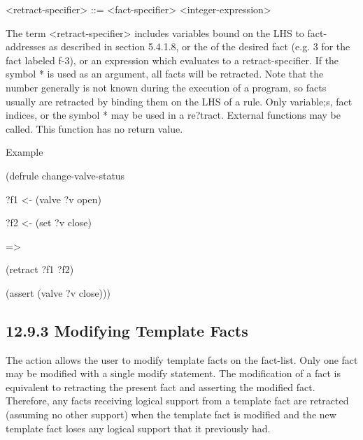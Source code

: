 \documentclass[letterpaper,10pt,english]{sphinxmanual}
\begin{document}

\begin{sphinxVerbatim}[commandchars=\\\{\}]
  \PYGZbs{} \PYGZbs{}
\end{sphinxVerbatim}

\textless{}retract-specifier\textgreater{} ::= \textless{}fact-specifier\textgreater{} \textbar{} \textless{}integer-expression\textgreater{}

The term \textless{}retract-specifier\textgreater{} includes variables bound on the LHS to
fact-addresses as described in section 5.4.1.8, or the  of
the desired fact (e.g. 3 for the fact labeled f-3), or an expression
which evaluates to a retract-specifier. If the symbol * is used as an
argument, all facts will be retracted. Note that the number generally is
not known during the execution of a program, so facts usually are
retracted by binding them on the LHS of a rule. Only variable;s, fact
indices, or the symbol * may be used in a re?tract. External functions
may  be called. This function has no return value.

Example

\begin{DUlineblock}{0em}
\item[] (defrule change-valve-status
\item[] ?f1 \textless{}- (valve ?v open)
\item[] ?f2 \textless{}- (set ?v close)
\item[] =\textgreater{}
\item[] (retract ?f1 ?f2)
\item[] (assert (valve ?v close)))
\end{DUlineblock}


\subsection{12.9.3 Modifying Template Facts}
\label{\detokenize{actions:modifying-template-facts}}
The  action allows the user to modify template facts on the
fact-list. Only one fact may be modified with a single modify statement.
The modification of a fact is equivalent to retracting the present fact
and asserting the modified fact. Therefore, any facts receiving logical
support from a template fact are retracted (assuming no other support)
when the template fact is modified and the new template fact loses any
logical support that it previously had.
\end{document}
